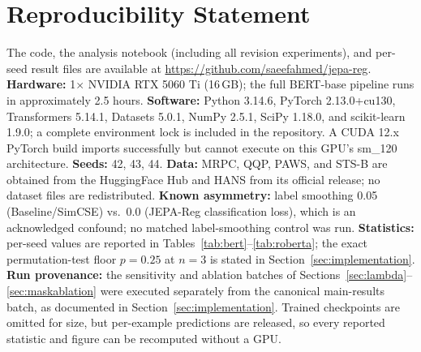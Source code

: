 \documentclass[sigconf]{acmart}
\begin{document}
\section{Reproducibility Statement}
\label{app:repro}
The code, the analysis notebook (including all revision experiments), and per-seed
result files are available at \url{https://github.com/saeefahmed/jepa-reg}.
\textbf{Hardware:} 1$\times$ NVIDIA RTX 5060 Ti (16\,GB); the full BERT-base pipeline
runs in approximately 2.5 hours.
\textbf{Software:} Python 3.14.6, PyTorch 2.13.0+cu130, Transformers 5.14.1,
Datasets 5.0.1, NumPy 2.5.1, SciPy 1.18.0, and scikit-learn 1.9.0; a complete
environment lock is included in the repository. A CUDA 12.x PyTorch build imports
successfully but cannot execute on this GPU's sm\_120 architecture.
\textbf{Seeds:} 42, 43, 44.
\textbf{Data:} MRPC, QQP, PAWS, and STS-B are obtained from the HuggingFace Hub and
HANS from its official release; no dataset files are redistributed.
\textbf{Known asymmetry:} label smoothing 0.05 (Baseline/SimCSE) vs.\ 0.0 (JEPA-Reg
classification loss), which is an acknowledged confound; no matched label-smoothing
control was run.
\textbf{Statistics:} per-seed values are reported in
Tables~\ref{tab:bert}--\ref{tab:roberta}; the exact permutation-test floor $p=0.25$
at $n=3$ is stated in Section~\ref{sec:implementation}.
\textbf{Run provenance:} the sensitivity and ablation batches of
Sections~\ref{sec:lambda}--\ref{sec:maskablation} were executed separately from the
canonical main-results batch, as documented in Section~\ref{sec:implementation}.
Trained checkpoints are omitted for size, but per-example predictions are released,
so every reported statistic and figure can be recomputed without a GPU.
\FloatBarrier


\end{document}
